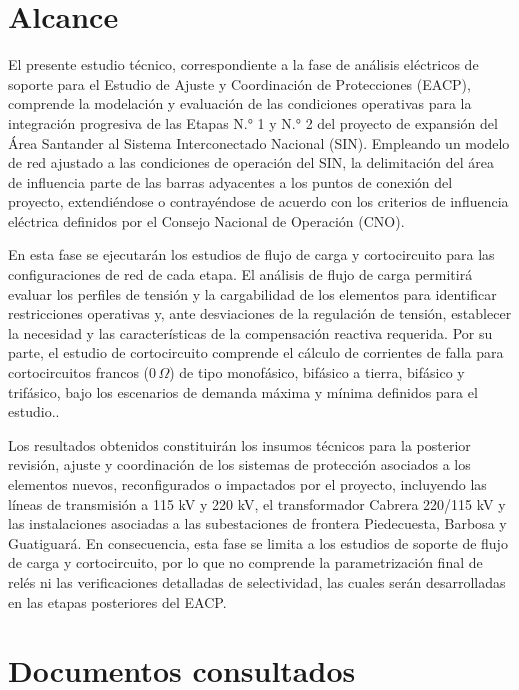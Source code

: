 \documentclass[12pt]{article}
\begin{document}
\section{Alcance}

El presente estudio técnico, correspondiente a la fase de análisis eléctricos de soporte para el Estudio de Ajuste y Coordinación de Protecciones (EACP), comprende la modelación y evaluación de las condiciones operativas para la integración progresiva de las Etapas N.° 1 y N.° 2 del proyecto de expansión del Área Santander al Sistema Interconectado Nacional (SIN). Empleando un modelo de red ajustado a las condiciones de operación del SIN, la delimitación del área de influencia parte de las barras adyacentes a los puntos de conexión del proyecto, extendiéndose o contrayéndose de acuerdo con los criterios de influencia eléctrica definidos por el Consejo Nacional de Operación (CNO).

En esta fase se ejecutarán los estudios de flujo de carga y cortocircuito para las configuraciones de red de cada etapa. El análisis de flujo de carga permitirá evaluar los perfiles de tensión y la cargabilidad de los elementos para identificar restricciones operativas y, ante desviaciones de la regulación de tensión, establecer la necesidad y las características de la compensación reactiva requerida. Por su parte, el estudio de cortocircuito comprende el cálculo de corrientes de falla para cortocircuitos francos (\(0\,\Omega\)) de tipo monofásico, bifásico a tierra, bifásico y trifásico, bajo los escenarios de demanda máxima y mínima definidos para el estudio..

Los resultados obtenidos constituirán los insumos técnicos para la posterior revisión, ajuste y coordinación de los sistemas de protección asociados a los elementos nuevos, reconfigurados o impactados por el proyecto, incluyendo las líneas de transmisión a 115 kV y 220 kV, el transformador Cabrera 220/115 kV y las instalaciones asociadas a las subestaciones de frontera Piedecuesta, Barbosa y Guatiguará. En consecuencia, esta fase se limita a los estudios de soporte de flujo de carga y cortocircuito, por lo que no comprende la parametrización final de relés ni las verificaciones detalladas de selectividad, las cuales serán desarrolladas en las etapas posteriores del EACP.

\section{Documentos consultados}
\end{document}
